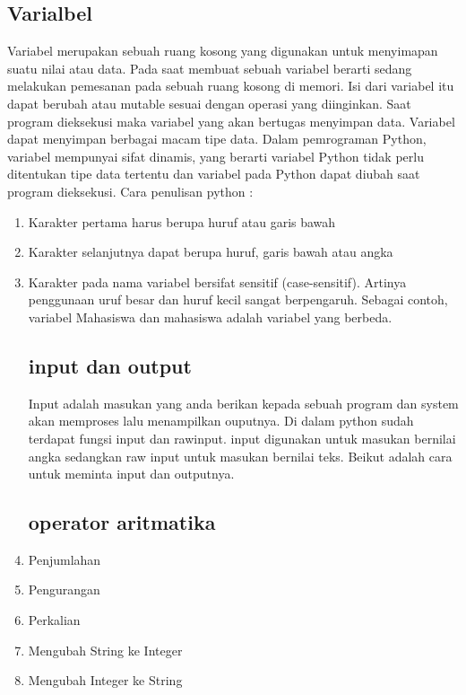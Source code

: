 \subsection{Varialbel}
Variabel merupakan sebuah ruang kosong yang digunakan untuk menyimapan suatu nilai atau data. Pada saat membuat sebuah variabel berarti sedang melakukan pemesanan pada sebuah ruang kosong di memori. Isi dari variabel itu dapat berubah atau mutable sesuai dengan operasi yang diinginkan. Saat program dieksekusi maka variabel yang akan bertugas menyimpan data. 
Variabel dapat menyimpan berbagai macam tipe data. Dalam pemrograman Python, variabel mempunyai sifat dinamis, yang berarti variabel Python tidak perlu ditentukan tipe data tertentu dan variabel pada Python dapat diubah saat program dieksekusi.
Cara penulisan python :
\begin{enumerate}
    \item Karakter pertama harus berupa huruf atau garis bawah
    \item Karakter selanjutnya dapat berupa huruf, garis bawah atau angka
    \item Karakter pada nama variabel bersifat sensitif (case-sensitif). Artinya penggunaan uruf besar dan huruf kecil sangat berpengaruh. Sebagai contoh, variabel Mahasiswa dan mahasiswa adalah variabel yang berbeda.    

\subsection{input dan output}
Input adalah masukan yang anda berikan kepada sebuah program dan system akan memproses lalu menampilkan ouputnya. Di dalam python sudah terdapat fungsi input dan rawinput. input digunakan untuk masukan bernilai angka sedangkan raw input untuk masukan bernilai teks.
Beikut adalah cara untuk meminta input dan outputnya.

\subsection{operator aritmatika}

    \item Penjumlahan

    \item Pengurangan

    \item Perkalian

    \item Mengubah String ke Integer

    \item Mengubah Integer ke String


\end{enumerate}
